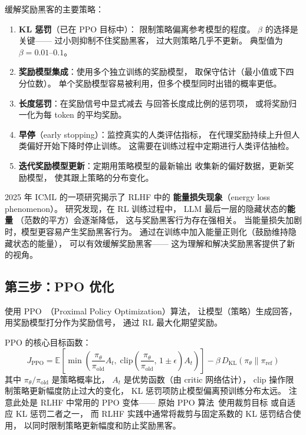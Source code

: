 缓解奖励黑客的主要策略：
\begin{enumerate}[noitemsep]
  \item \textbf{KL 惩罚}（已在 PPO 目标中）：
        限制策略偏离参考模型的程度。
        $\beta$ 的选择是关键——
        过小则抑制不住奖励黑客，
        过大则策略几乎不更新。
        典型值为 $\beta = 0.01$--$0.1$。
  \item \textbf{奖励模型集成}：使用多个独立训练的奖励模型，
        取保守估计（最小值或下四分位数）。
        单个奖励模型容易被利用，但多个模型同时出错的概率更低。
  \item \textbf{长度惩罚}：在奖励信号中显式减去
        与回答长度成比例的惩罚项，
        或将奖励归一化为每 token 的平均奖励。
  \item \textbf{早停}（early stopping）：监控真实的人类评估指标，
        在代理奖励持续上升但人类偏好开始下降时停止训练。
        这需要在训练过程中定期进行人类评估抽检。
  \item \textbf{迭代奖励模型更新}：定期用策略模型的最新输出
        收集新的偏好数据，更新奖励模型，
        使其跟上策略的分布变化。
\end{enumerate}

\begin{warnbox}[能量损失现象与奖励黑客]
2025 年 ICML 的一项研究揭示了 RLHF 中的
\textbf{能量损失现象}（energy loss phenomenon）。
研究发现，在 RL 训练过程中，
LLM 最后一层的隐藏状态的\textbf{能量}
（范数的平方）会逐渐降低，
这与奖励黑客行为存在强相关。
当能量损失加剧时，模型更容易产生奖励黑客行为。
通过在训练中加入能量正则化（鼓励维持隐藏状态的能量），
可以有效缓解奖励黑客——
这为理解和解决奖励黑客提供了新的视角。
\end{warnbox}

\subsection{第三步：PPO 优化}

使用 PPO~\cite{schulman2017ppo}（Proximal Policy Optimization）算法，
让模型（策略）生成回答，
用奖励模型打分作为奖励信号，
通过 RL 最大化期望奖励。

PPO 的核心目标函数：
\begin{equation}
  J_{\mathrm{PPO}} = \mathbb{E}\!\left[
    \min\!\left(\frac{\pi_\theta}{\pi_{\mathrm{old}}} A_t,\;
    \mathrm{clip}\!\left(\frac{\pi_\theta}{\pi_{\mathrm{old}}},\,
    1 \pm \epsilon\right) A_t\right)
  \right] - \beta \, D_{\mathrm{KL}}(\pi_\theta \| \pi_{\mathrm{ref}})
\end{equation}
其中 $\pi_\theta / \pi_{\mathrm{old}}$ 是策略概率比，
$A_t$ 是优势函数（由 critic 网络估计），
clip 操作限制策略更新幅度防止过大的变化，
KL 惩罚项防止模型偏离预训练分布太远。
注意此处是 RLHF 中常用的 PPO 变体——
原始 PPO 算法~\cite{schulman2017ppo}使用裁剪目标
或自适应 KL 惩罚二者之一，
而 RLHF 实践中通常将裁剪与固定系数的 KL 惩罚结合使用，
以同时限制策略更新幅度和防止奖励黑客。

